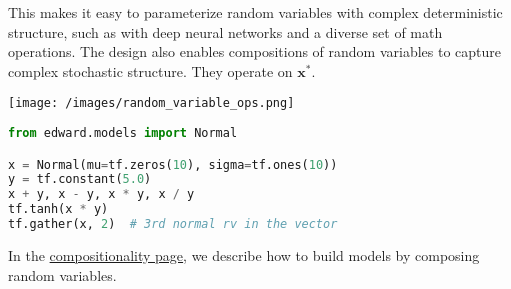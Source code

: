 This makes it easy to parameterize random variables with complex deterministic
structure, such as with deep neural networks and a diverse set of math
operations.
The design also enables compositions of random variables
to capture complex stochastic structure.
They operate on $\mathbf{x}^*$.

\texttt{[image: /images/random\_variable\_ops.png]}

\begin{lstlisting}[language=Python]
from edward.models import Normal

x = Normal(mu=tf.zeros(10), sigma=tf.ones(10))
y = tf.constant(5.0)
x + y, x - y, x * y, x / y
tf.tanh(x * y)
tf.gather(x, 2)  # 3rd normal rv in the vector
\end{lstlisting}

In the \href{/api/model-compositionality}{compositionality page}, we
describe how to build models by composing random variables.
